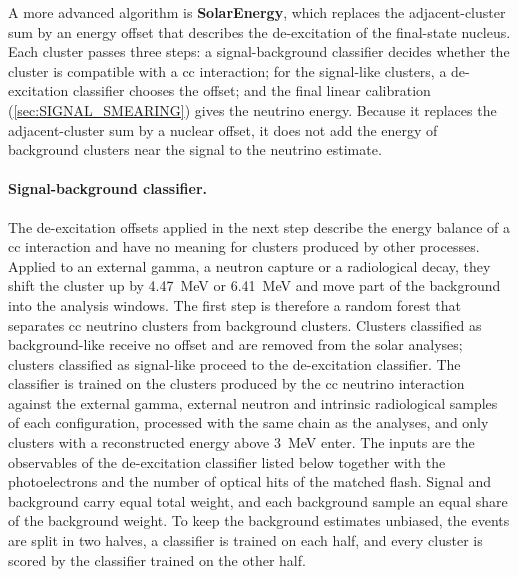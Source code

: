 A more advanced algorithm is \textbf{SolarEnergy}, which replaces the adjacent-cluster sum by an energy offset that describes the de-excitation of the final-state nucleus. Each cluster passes three steps: a signal-background classifier decides whether the cluster is compatible with a \gls{cc} interaction; for the signal-like clusters, a de-excitation classifier chooses the offset; and the final linear calibration (\cref{sec:SIGNAL_SMEARING}) gives the neutrino energy. Because it replaces the adjacent-cluster sum by a nuclear offset, it does not add the energy of background clusters near the signal to the neutrino estimate.

\paragraph{Signal-background classifier.} The de-excitation offsets applied in the next step describe the energy balance of a \gls{cc} interaction and have no meaning for clusters produced by other processes. Applied to an external gamma, a neutron capture or a radiological decay, they shift the cluster up by \SI{4.47}{\mega\electronvolt} or \SI{6.41}{\mega\electronvolt} and move part of the background into the analysis windows. The first step is therefore a random forest that separates \gls{cc} neutrino clusters from background clusters. Clusters classified as background-like receive no offset and are removed from the solar analyses; clusters classified as signal-like proceed to the de-excitation classifier. The classifier is trained on the clusters produced by the \gls{cc} neutrino interaction against the external gamma, external neutron and intrinsic radiological samples of each configuration, processed with the same chain as the analyses, and only clusters with a reconstructed energy above \SI{3}{\mega\electronvolt} enter. The inputs are the observables of the de-excitation classifier listed below together with the photoelectrons and the number of optical hits of the matched flash. Signal and background carry equal total weight, and each background sample an equal share of the background weight. To keep the background estimates unbiased, the events are split in two halves, a classifier is trained on each half, and every cluster is scored by the classifier trained on the other half.

